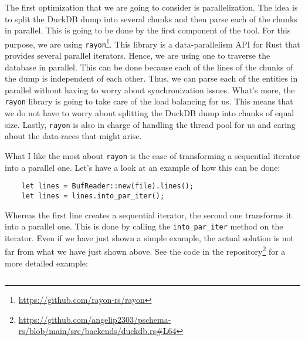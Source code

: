 The first optimization that we are going to consider is parallelization. The idea is to split the DuckDB dump into several chunks and then parse each of the chunks in parallel. This is going to be done by the first component of the tool. For this purpose, we are using \texttt{rayon}\footnote{\url{https://github.com/rayon-rs/rayon}}. This library is a data-parallelism API for Rust that provides several parallel iterators. Hence, we are using one to traverse the database in parallel. This can be done because each of the lines of the chunks of the dump is independent of each other. Thus, we can parse each of the entities in parallel without having to worry about synchronization issues. What's more, the \texttt{rayon} library is going to take care of the load balancing for us. This means that we do not have to worry about splitting the DuckDB dump into chunks of equal size. Lastly, \texttt{rayon} is also in charge of handling the thread pool for us and caring about the data-races that might arise.

What I like the most about \texttt{rayon} is the ease of transforming a sequential iterator into a parallel one. Let's have a look at an example of how this can be done:

\begin{verbatim}
    let lines = BufReader::new(file).lines();
    let lines = lines.into_par_iter();
\end{verbatim}

Whereas the first line creates a sequential iterator, the second one transforms it into a parallel one. This is done by calling the \texttt{into\_par\_iter} method on the iterator. Even if we have just shown a simple example, the actual solution is not far from what we have just shown above. See the code in the repository\footnote{\url{https://github.com/angelip2303/pschema-rs/blob/main/src/backends/duckdb.rs\#L64}} for a more detailed example:

\begin{code}
    \inputminted{rust}{code/listings/11-2_duckdb.rs}
\end{code}